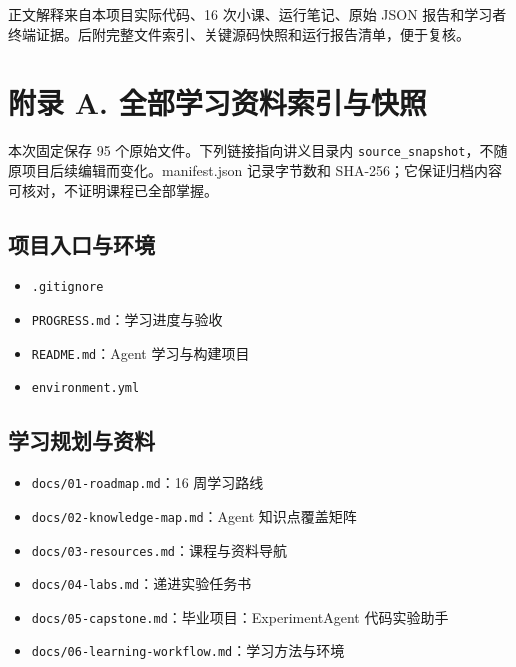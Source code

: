 正文解释来自本项目实际代码、16 次小课、运行笔记、原始 JSON 报告和学习者终端证据。后附完整文件索引、关键源码快照和运行报告清单，便于复核。

\section{附录 A. 全部学习资料索引与快照}
本次固定保存 95 个原始文件。下列链接指向讲义目录内 \nolinkurl{source_snapshot}，不随原项目后续编辑而变化。manifest.json 记录字节数和 SHA-256；它保证归档内容可核对，不证明课程已全部掌握。

\subsection{项目入口与环境}
\begin{itemize}
\item \nolinkurl{.gitignore}
\item \nolinkurl{PROGRESS.md}：学习进度与验收
\item \nolinkurl{README.md}：Agent 学习与构建项目
\item \nolinkurl{environment.yml}
\end{itemize}

\subsection{学习规划与资料}
\begin{itemize}
\item \nolinkurl{docs/01-roadmap.md}：16 周学习路线
\item \nolinkurl{docs/02-knowledge-map.md}：Agent 知识点覆盖矩阵
\item \nolinkurl{docs/03-resources.md}：课程与资料导航
\item \nolinkurl{docs/04-labs.md}：递进实验任务书
\item \nolinkurl{docs/05-capstone.md}：毕业项目：ExperimentAgent 代码实验助手
\item \nolinkurl{docs/06-learning-workflow.md}：学习方法与环境
\end{itemize}

